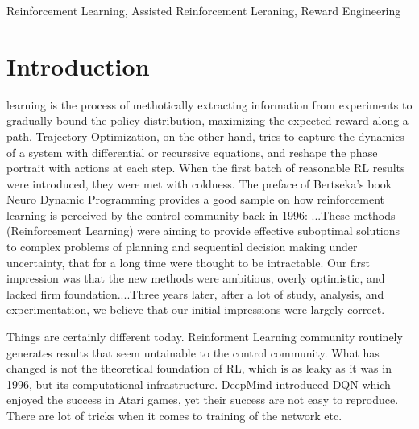 \documentclass[journal]{IEEEtran}
\begin{document}
\begin{IEEEkeywords}
Reinforcement Learning, Assisted Reinforcement Leraning, Reward Engineering
\end{IEEEkeywords}
%
\IEEEpeerreviewmaketitle


\section{Introduction}
 learning is the process of methotically extracting information from experiments to gradually bound the policy distribution, maximizing the expected reward along a path. Trajectory Optimization, on the other hand, tries to capture the dynamics of a system with differential or recurssive equations, and reshape the phase portrait with actions at each step. When the first batch of reasonable RL results were introduced, they were met with coldness. The preface of Bertseka's book Neuro Dynamic Programming provides a good sample on how reinforcement learning is perceived by the control community back in 1996: ...These methods (Reinforcement Learning) were aiming to provide effective suboptimal solutions to complex problems of planning and sequential decision making under uncertainty, that for a long time were thought to be intractable. Our first impression was that the new methods were ambitious, overly optimistic, and lacked firm foundation....Three years later, after a lot of study, analysis, and experimentation, we believe that our initial impressions were largely correct. \cite{Bertsekas1996NeuroDynamicP}

Things are certainly different today. Reinforment Learning community routinely generates results that seem untainable to the control community. What has changed is not the theoretical foundation of RL, which is as leaky as it was in 1996, but its computational infrastructure. DeepMind introduced DQN which enjoyed the success in Atari games, yet their success are not easy to reproduce. There are lot of tricks when it comes to training of the network etc.
\end{document}
